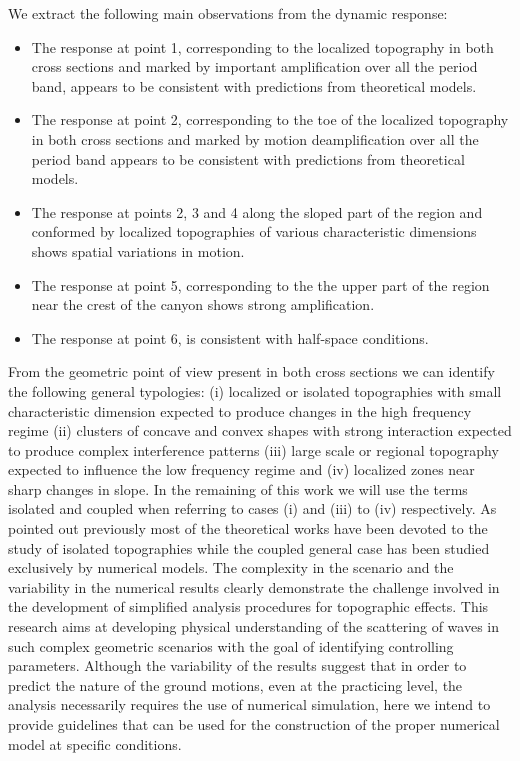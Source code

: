 \documentclass[11pt,letterpaper]{article}
\begin{document}
We extract the following main observations from the dynamic response:

\begin{itemize}
\item The response at point 1, corresponding to the localized topography in both cross sections and marked by important amplification over all the period band, appears to be consistent with predictions from theoretical models.
\item The response at point 2, corresponding to the toe of the localized topography in both cross sections and marked by motion deamplification over all the period band appears to be consistent with predictions from theoretical models.
\item The response at points 2, 3 and 4 along the sloped part of the region and conformed by localized topographies of various characteristic dimensions shows spatial variations in motion.
\item The response at point 5,  corresponding to the the upper part of the region near the crest of the canyon shows strong amplification.
\item The response at point 6,  is consistent with half-space conditions.
\end{itemize}

From the geometric point of view present in both cross sections we can identify the following general typologies: (i) localized or isolated topographies with small characteristic dimension expected to produce changes in the high frequency regime (ii) clusters of concave and convex shapes with strong interaction expected to produce complex interference patterns (iii) large scale or regional topography expected to influence the low frequency regime and (iv) localized zones near sharp changes in slope. In the remaining of this work we will use the terms isolated and coupled when referring to cases (i) and (iii) to (iv) respectively. As pointed out previously most of the theoretical works have been devoted to the study of isolated topographies while the coupled general case has been studied exclusively by numerical models. The complexity in the scenario and the variability in the numerical results clearly demonstrate the challenge involved in the development of simplified analysis procedures for topographic effects. This research aims at developing physical understanding of the scattering of waves in such complex geometric scenarios with the goal of identifying controlling parameters. Although the variability of the results suggest that in order to predict the nature of the ground motions, even at the practicing level, the analysis necessarily requires the use of numerical simulation, here we intend to provide guidelines that can be used for the construction of the proper numerical model at specific conditions. 
\end{document}
